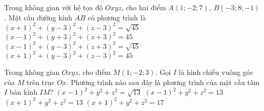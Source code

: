 \begin{ex}%
	Trong không gian với hệ tọa độ $Oxyz$, cho hai điểm $A(1;-2;7),\ B(-3;8;-1)$. Mặt cầu đường kính $AB$ có phương trình là
	\choice
	{$(x+1)^2+(y-3)^2+(z-3)^2=\sqrt{45}$}
	{$(x-1)^2+(y+3)^2+(z+3)^2=45$}
	{$(x-1)^2+(y-3)^2+(z+3)^2=\sqrt{45}$}
	{\True $(x+1)^2+(y-3)^2+(z-3)^2=45$}
\end{ex}
\begin{ex}%
	Trong không gian $Oxyz$, cho điểm $M(1;-2;3)$. Gọi $I$ là hình chiếu vuông góc của $M$ trên trục $Ox$. Phương trình nào sau đây là phương trình của mặt cầu tâm $I$ bán kính $IM$?
	\choice
	{$(x-1)^2+y^2+z^2=\sqrt{13}$}
	{\True $(x-1)^2+y^2+z^2=13$}
	{$(x+1)^2+y^2+z^2=13$}
	{$(x+1)^2+y^2+z^2=17$}
\end{ex}

